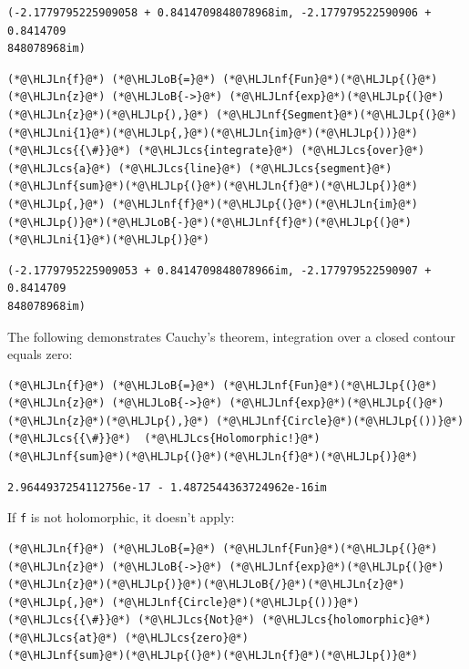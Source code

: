\documentclass[12pt,a4paper]{article}
\newcommand{\HLJLn}[1]{#1}
\newcommand{\HLJLnf}[1]{\textcolor[RGB]{66,102,213}{#1}}
\newcommand{\HLJLni}[1]{\textcolor[RGB]{59,151,46}{#1}}
\newcommand{\HLJLoB}[1]{\textcolor[RGB]{102,102,102}{\textbf{#1}}}
\newcommand{\HLJLp}[1]{#1}
\newcommand{\HLJLcs}[1]{\textcolor[RGB]{153,153,119}{\textit{#1}}}
\begin{document}
\begin{lstlisting}
(-2.1779795225909058 + 0.8414709848078968im, -2.177979522590906 + 0.8414709
848078968im)
\end{lstlisting}


\begin{lstlisting}
(*@\HLJLn{f}@*) (*@\HLJLoB{=}@*) (*@\HLJLnf{Fun}@*)(*@\HLJLp{(}@*) (*@\HLJLn{z}@*) (*@\HLJLoB{->}@*) (*@\HLJLnf{exp}@*)(*@\HLJLp{(}@*)(*@\HLJLn{z}@*)(*@\HLJLp{),}@*) (*@\HLJLnf{Segment}@*)(*@\HLJLp{(}@*)(*@\HLJLni{1}@*)(*@\HLJLp{,}@*)(*@\HLJLn{im}@*)(*@\HLJLp{))}@*) (*@\HLJLcs{{\#}}@*) (*@\HLJLcs{integrate}@*) (*@\HLJLcs{over}@*) (*@\HLJLcs{a}@*) (*@\HLJLcs{line}@*) (*@\HLJLcs{segment}@*)
(*@\HLJLnf{sum}@*)(*@\HLJLp{(}@*)(*@\HLJLn{f}@*)(*@\HLJLp{)}@*)  (*@\HLJLp{,}@*) (*@\HLJLnf{f}@*)(*@\HLJLp{(}@*)(*@\HLJLn{im}@*)(*@\HLJLp{)}@*)(*@\HLJLoB{-}@*)(*@\HLJLnf{f}@*)(*@\HLJLp{(}@*)(*@\HLJLni{1}@*)(*@\HLJLp{)}@*)
\end{lstlisting}

\begin{lstlisting}
(-2.1779795225909053 + 0.8414709848078966im, -2.177979522590907 + 0.8414709
848078968im)
\end{lstlisting}


The following demonstrates Cauchy's theorem, integration over a closed contour equals zero:


\begin{lstlisting}
(*@\HLJLn{f}@*) (*@\HLJLoB{=}@*) (*@\HLJLnf{Fun}@*)(*@\HLJLp{(}@*) (*@\HLJLn{z}@*) (*@\HLJLoB{->}@*) (*@\HLJLnf{exp}@*)(*@\HLJLp{(}@*)(*@\HLJLn{z}@*)(*@\HLJLp{),}@*) (*@\HLJLnf{Circle}@*)(*@\HLJLp{())}@*)  (*@\HLJLcs{{\#}}@*)  (*@\HLJLcs{Holomorphic!}@*)
(*@\HLJLnf{sum}@*)(*@\HLJLp{(}@*)(*@\HLJLn{f}@*)(*@\HLJLp{)}@*)
\end{lstlisting}

\begin{lstlisting}
2.9644937254112756e-17 - 1.4872544363724962e-16im
\end{lstlisting}


If \texttt{f} is not holomorphic, it doesn't apply:


\begin{lstlisting}
(*@\HLJLn{f}@*) (*@\HLJLoB{=}@*) (*@\HLJLnf{Fun}@*)(*@\HLJLp{(}@*) (*@\HLJLn{z}@*) (*@\HLJLoB{->}@*) (*@\HLJLnf{exp}@*)(*@\HLJLp{(}@*)(*@\HLJLn{z}@*)(*@\HLJLp{)}@*)(*@\HLJLoB{/}@*)(*@\HLJLn{z}@*)(*@\HLJLp{,}@*) (*@\HLJLnf{Circle}@*)(*@\HLJLp{())}@*)  (*@\HLJLcs{{\#}}@*) (*@\HLJLcs{Not}@*) (*@\HLJLcs{holomorphic}@*) (*@\HLJLcs{at}@*) (*@\HLJLcs{zero}@*)
(*@\HLJLnf{sum}@*)(*@\HLJLp{(}@*)(*@\HLJLn{f}@*)(*@\HLJLp{)}@*)
\end{lstlisting}
\end{document}

